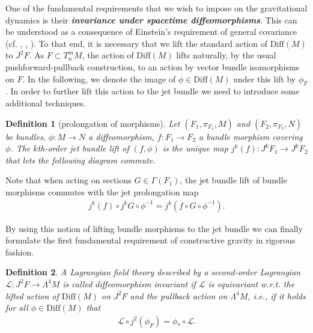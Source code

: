 \documentclass[%
preprint,
titlepage,
nofootinbib,
amsmath,amssymb,
showkeys,
aps,
prd,
floatfix,
]{revtex4-2}
\newtheorem{definition}{Definition}
\begin{document}
One of the fundamental requirements that we wish to impose on the gravitational dynamics is their \textit{\textbf{invariance under spacetime diffeomorphisms}}. 
This can be understood as a consequence of Einstein's requirement of general covariance (cf. \cite{Stachel1993-STATMO-5}, \cite{Pooley}, \cite{Norton1993-NORGCA}).
To that end, it is necessary that we lift the standard action of $\mathrm{Diff}(M)$ to $J^2F$.
As $F\subset T^m_nM$, the action of $\mathrm{Diff}(M)$ lifts naturally, by the usual pushforward-pullback construction, to an action by vector bundle isomorphisms on $F$.
In the following, we denote the image of $\phi \in \mathrm{Diff}(M)$ under this lift by $\phi_F$.
In order to further lift this action to the jet bundle we need to introduce some additional techniques.
\begin{definition}[prolongation of morphisms]
Let $(F_1,\pi_{F_1},M)$ and $(F_2,\pi_{F_2},N)$ be bundles, $\phi : M \rightarrow N$ a diffeomorphism, $f : F_1 \rightarrow F_2$ a bundle morphism covering $\phi$. The $k$th-order jet bundle lift of $(f,\phi)$ is the unique  map $j^k(f):J^kF_1 \rightarrow J^kF_2$ that lets the following diagram commute.
\begin{center}
\end{center}
\end{definition}
Note that when acting on sections $G \in \Gamma(F_1)$, the jet bundle lift of bundle morphisms commutes with the jet prolongation map
\begin{align}
j^k(f) \circ j^kG \circ \phi^{-1} = j^k \left (
f \circ G \circ \phi^{-1} \right ).
\end{align}

By using this notion of lifting bundle morphisms to the jet bundle we can finally formulate the first fundamental requirement of constructive gravity in rigorous fashion. 
\begin{definition}
A Lagrangian field theory described by a second-order Lagrangian $\mathcal{L} : J^2F \rightarrow \Lambda^4 M$ is called diffeomorphism invariant if $\mathcal{L}$ is equivariant w.r.t. the lifted action of $\mathrm{Diff}(M)$ on $J^2F$ and the pullback action on $\Lambda^4M$, i.e., if it holds for all $\phi \in \mathrm{Diff}(M)$ that 
\begin{align}\label{DiffeoReq}\tag{Axiom 1}
     \mathcal{L}\circ j^2(\phi_F) = \phi_{\ast} \circ \mathcal{L}.
\end{align}
\end{definition}
\end{document}
